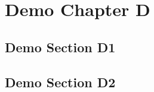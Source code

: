 

\chapter{Demo Chapter D}
\label{ch:ch5}
\lipsum[50-51]


\section{Demo Section D1}
\lipsum[52-53]


\section{Demo Section D2}
\lipsum[54-55]
